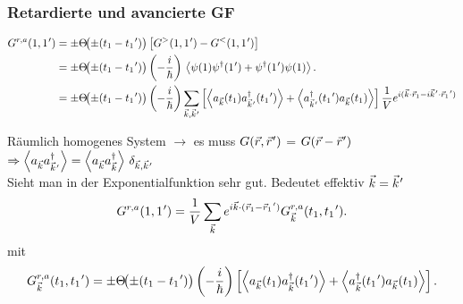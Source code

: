 \subsubsection*{Retardierte und avancierte GF}
\begin{equation}\label{f:BeginGra}
  \begin{aligned}
    G^{r,a}(1,1\mkern1mu')
     & = \pm\Theta\!\bigl(\pm(t_1-t_1\mkern1mu')\bigr)\left[G^{>}(1,1\mkern1mu')-G^{<}(1,1\mkern1mu')\right]                                                                                                                                                                                                                                      \\
     & = \pm\Theta\!\bigl(\pm(t_1-t_1\mkern1mu')\bigr)\left(-\frac{i}{\hbar}\right)\,\left\langle\psi(1)\psi^{\dagger}(1\mkern1mu')+\psi^{\dagger}(1\mkern1mu')\psi(1)\right\rangle.                                                                                                                                                                                 \\
     & = \pm\Theta\!\bigl(\pm(t_1-t_1\mkern1mu')\bigr)\left(-\frac{i}{\hbar}\right)\sum_{\vec k,\vec k\mkern1mu'}\left[\left\langle a_{\vec k}(t_1)a^{\dagger}_{\vec k\mkern1mu'}(t_1\mkern1mu')\right\rangle+\left\langle a^{\dagger}_{\vec k\mkern1mu'}(t_1\mkern1mu')a_{\vec k}(t_1)\right\rangle\right]\frac{1}{V}e^{i(\vec k\cdot\vec r_1-i\vec k\mkern1mu'\cdot\vec r_1\mkern1mu')}
  \end{aligned}
\end{equation}

Räumlich homogenes System $\rightarrow$ es muss
$G(\vec r,\vec r\mkern1mu')$ = $G(\vec r-\vec
  r\mkern1mu')$ $\Rightarrow \left\langle a_{\vec
        k}a^{\dagger}_{\vec k\mkern1mu'}\right\rangle=\left\langle a_{\vec
        k}a^{\dagger}_{\vec k}\right\rangle\,\delta_{\vec k,\vec
    k\mkern1mu'}$\\ Sieht man in der
Exponentialfunktion sehr gut. Bedeutet effektiv
$\vec k = \vec k \mkern1mu'$
\begin{equation}
  G^{r,a}(1,1\mkern1mu')
  = \frac{1}{V}\sum_{\vec k}e^{i\vec k\cdot(\vec r_1-\vec r_1\mkern1mu')}
  G^{r,a}_{\vec k}(t_1,t_1\mkern1mu').
\end{equation}
mit
\begin{equation}
  G^{r,a}_{\vec k}(t_1,t_1\mkern1mu')
  = \pm\Theta\!\bigl(\pm(t_1-t_1\mkern1mu')\bigr)\left(-\frac{i}{\hbar}\right)
  \left[\left\langle a_{\vec k}(t_1)a^{\dagger}_{\vec k}(t_1\mkern1mu')\right\rangle+\left\langle a^{\dagger}_{\vec k}(t_1\mkern1mu')a_{\vec k}(t_1)\right\rangle\right].
\end{equation}

